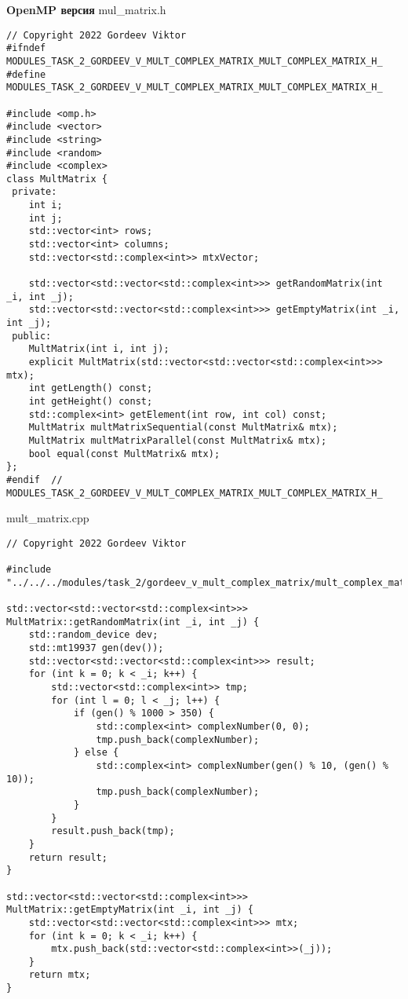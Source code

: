 \documentclass{report}
\begin{document}
\begin{enumerate}
\begin{lstlisting}
\end{lstlisting}

\textbf{OpenMP версия}
\newline
\newline mul_matrix.h
\begin{lstlisting}
// Copyright 2022 Gordeev Viktor
#ifndef MODULES_TASK_2_GORDEEV_V_MULT_COMPLEX_MATRIX_MULT_COMPLEX_MATRIX_H_
#define MODULES_TASK_2_GORDEEV_V_MULT_COMPLEX_MATRIX_MULT_COMPLEX_MATRIX_H_

#include <omp.h>
#include <vector>
#include <string>
#include <random>
#include <complex>
class MultMatrix {
 private:
    int i;
    int j;
    std::vector<int> rows;
    std::vector<int> columns;
    std::vector<std::complex<int>> mtxVector;

    std::vector<std::vector<std::complex<int>>> getRandomMatrix(int _i, int _j);
    std::vector<std::vector<std::complex<int>>> getEmptyMatrix(int _i, int _j);
 public:
    MultMatrix(int i, int j);
    explicit MultMatrix(std::vector<std::vector<std::complex<int>>> mtx);
    int getLength() const;
    int getHeight() const;
    std::complex<int> getElement(int row, int col) const;
    MultMatrix multMatrixSequential(const MultMatrix& mtx);
    MultMatrix multMatrixParallel(const MultMatrix& mtx);
    bool equal(const MultMatrix& mtx);
};
#endif  // MODULES_TASK_2_GORDEEV_V_MULT_COMPLEX_MATRIX_MULT_COMPLEX_MATRIX_H_

\end{lstlisting}
mult_matrix.cpp
\begin{lstlisting}
// Copyright 2022 Gordeev Viktor

#include "../../../modules/task_2/gordeev_v_mult_complex_matrix/mult_complex_matrix.h"

std::vector<std::vector<std::complex<int>>>
MultMatrix::getRandomMatrix(int _i, int _j) {
    std::random_device dev;
    std::mt19937 gen(dev());
    std::vector<std::vector<std::complex<int>>> result;
    for (int k = 0; k < _i; k++) {
        std::vector<std::complex<int>> tmp;
        for (int l = 0; l < _j; l++) {
            if (gen() % 1000 > 350) {
                std::complex<int> complexNumber(0, 0);
                tmp.push_back(complexNumber);
            } else {
                std::complex<int> complexNumber(gen() % 10, (gen() % 10));
                tmp.push_back(complexNumber);
            }
        }
        result.push_back(tmp);
    }
    return result;
}

std::vector<std::vector<std::complex<int>>>
MultMatrix::getEmptyMatrix(int _i, int _j) {
    std::vector<std::vector<std::complex<int>>> mtx;
    for (int k = 0; k < _i; k++) {
        mtx.push_back(std::vector<std::complex<int>>(_j));
    }
    return mtx;
}


\end{lstlisting}
\end{enumerate}
\end{document}
